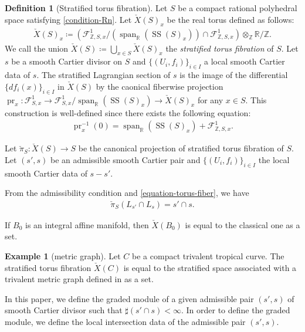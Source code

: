 \documentclass[a4paper,dvipdfmx,reqno,12pt]{amsart}
\theoremstyle{definition}
\newtheorem{definition}[theorem]{Definition}
\newtheorem{example}[theorem]{Example}
\newcommand{\deq}{\coloneqq}
\newcommand{\Z}{\mathbb{Z}}%
\newcommand{\opn}[1]{\operatorname{#1}}
\numberwithin{equation}{section}
\begin{document}
\begin{definition}[{Stratified torus fibration}]
Let $S$ be a compact rational polyhedral space 
satisfying \cref{condition-Rn}.
Let $\check{X}(S)_x$ be 
the real torus defined as follows:
\begin{align}
\check{X}(S)_x\deq  
(\mathcal{F}_{\mathbb{Z},S,x}^{1}/(\opn{span}_{{\mathbb{R}}}
(\opn{SS}(S)_x))\cap \mathcal{F}_{\mathbb{Z},S,x}^{1})\otimes_{\Z} {\mathbb{R}}/\Z.
\end{align}
We call the union $\check{X}(S)\deq \bigcup_{x\in S}\check{X}(S)_x$
the \emph{stratified torus 
fibration} of $S$.
Let $s$ be a smooth 
Cartier divisor on $S$ and $\{(U_i,f_i)\}_{i\in I}$ a local
smooth Cartier data of $s$. 
The stratified Lagrangian section of $s$ is the image of the 
differential  $\{df_i(x)\}_{i\in I}$ in $\check{X}(S)$
by the caonical fiberwise projection 
$\opn{pr}_x\colon \mathcal{F}_{S,x}^{1}
\to \mathcal{F}_{S,x}^{1}/\opn{span}_{\mathbb{R}}(\opn{SS}(S)_x) \to \check{X}(S)_x$ for any $x\in S$.
This construction is well-defined since there exists 
the following equation: 
\begin{align}
\label{equation-torus-fiber}
\opn{pr}_x^{-1}(0)
=\opn{span}_{\mathbb{R}}(\opn{SS}(S)_x)+
\mathcal{F}^{1}_{\mathbb{Z},S,x}.
\end{align}

Let $\check{\pi}_S\colon \check{X}(S)\to S$ be the 
canonical projection of stratified torus fibration of $S$.
Let $(s',s)$ be an admissible smooth Cartier pair and 
$\{(U_i,f_i)\}_{i\in I}$ the local smooth Cartier data of $s-s'$.

From the admissibility condition and
\cref{equation-torus-fiber}, we have
\begin{align}
\check{\pi}_S(L_{s'}\cap L_s)=s'\cap s.
\end{align}
\end{definition}
If $B_0$ is an integral affine manifold, then
$\check{X}(B_0)$ is equal to the classical one as a set. 
\begin{example}[{metric graph}]
Let $C$ be a compact trivalent tropical curve.
The stratified torus fibration $\check{X}(C)$ is equal to 
the stratified space associated
with a trivalent metric graph defined in \cite{auroux2022lagrangian}
as a set.
\end{example}

In this paper, we
define the graded module of a given admissible pair 
$(s',s)$ of smooth Cartier divisor such that 
$\sharp (s'\cap s)<\infty$.
In order to define the graded module, we define the 
local intersection data of 
the admissible pair $(s',s)$.
\end{document}
